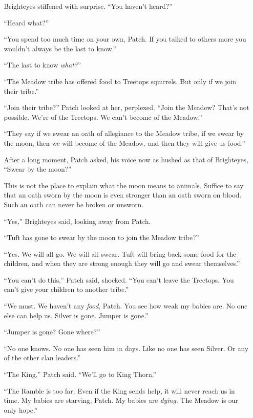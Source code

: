\documentclass[ebook,oneside,openany,17pt]{memoir}
\newenvironment{tolerant}[1]{%
  \par\tolerance=#1\relax
}{%
  \par
}
\begin{document}
Brighteyes stiffened with surprise. “You haven’t heard?”

“Heard what?”

“You spend too much time on your own, Patch. If you talked to others
more you wouldn’t always be the last to know.”

“The last to know \emph{what?}”

“The Meadow tribe has offered food to Treetops squirrels. But only if
we join their tribe.”

“Join their tribe?” Patch looked at her, perplexed. “Join the Meadow?
That’s not possible. We’re of the Treetops. We can’t become of the
Meadow.”

“They say if we swear an oath of allegiance to the Meadow tribe, if we
swear by the moon, then we will become of the Meadow, and then they
will give us food.”

After a long moment, Patch asked, his voice now as hushed as that of
Brighteyes, “Swear by the moon?”

This is not the place to explain what the moon means to
animals. Suffice to say that an oath sworn by the moon is even
stronger than an oath sworn on blood. Such an oath can never be broken
or unsworn.

“Yes,” Brighteyes said, looking away from Patch.

“Tuft has gone to swear by the moon to join the Meadow tribe?”

“Yes. We will all go. We will all swear. Tuft will bring back some
food for the children, and when they are strong enough they will go
and swear themselves.”

\begin{tolerant}{500}
“You can’t do this,” Patch said, shocked. “You can’t leave the
Treetops. You can’t give your children to another tribe.”
\end{tolerant}

“We must. We haven’t any \emph{food,} Patch. You see how weak my
babies are. No one else can help us. Silver is gone. Jumper is gone.”

“Jumper is gone? Gone where?”

“No one knows. No one has seen him in days. Like no one has seen
Silver. Or any of the other clan leaders.”

“The King,” Patch said. “We’ll go to King Thorn.”

“The Ramble is too far. Even if the King sends help, it will never
reach us in time. My babies are starving, Patch. My babies are
\emph{dying.} The Meadow is our only hope.”
\end{document}
